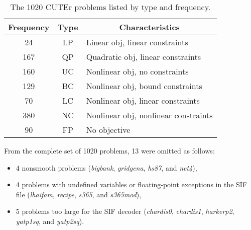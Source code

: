 \documentclass[draft,leqno,onefignum,onetabnum]{siamltex}
\def\strut{\rule[-1.25ex]{0pt}{4ex}}%
\def\strutl{\rule[-1.25ex]{0pt}{3ex}}%
\def\strutu{\rule{0pt}{3ex}}%
\def\SNOPT {{\small SNOPT}}
\def\Cute#1{\hbox{\it\lowercase{#1}\/}}
\begin{document}
\begin{table}[tb]
\caption{The\/ {\rm1020} CUTEr problems listed by type and frequency.}
\label{table_CUTE}
\begin{center} \footnotesize %
  \def\t{\phantom2} 
\begin{tabular}{|c|c|l|}\hline
  \multicolumn{1}{|c|}{\strut Frequency}& \multicolumn{1}{|c|}{Type}&
  \multicolumn{1}{c|}{Characteristics}
\\\hline\strutu \t24   &    LP   &   Linear obj,    linear constraints
\\               167   &    QP   &   Quadratic obj, linear constraints
\\               160   &    UC   &   Nonlinear obj, no constraints
\\               129   &    BC   &   Nonlinear obj, bound constraints
\\              \t70   &    LC   &   Nonlinear obj, linear constraints
\\               380   &    NC   &   Nonlinear obj, nonlinear constraints
\\\strutl       \t90   &    FP   &   No objective
\\\hline
\end{tabular}
\end{center}
\end{table}

From the complete set of 1020 problems, 13 were omitted as follows:
\begin{itemize}
 \item 4  nonsmooth problems
(\Cute{BIGBANK},
\Cute{GRIDGENA},
\Cute{HS87}, and
\Cute{NET4}),

 \item 4 problems with undefined variables or floating-point
  exceptions in the SIF file
({\it lhaifam},
\Cute{RECIPE},
\Cute{S365},
and
\Cute{S365MOD}),

 \item 5 problems too large for the SIF decoder
({\it chardis0},
\Cute{CHARDIS1},
\Cute{HARKERP2},
\Cute{YATP1SQ},
and \Cute{YATP2SQ}).
\end{itemize}

\end{document}
